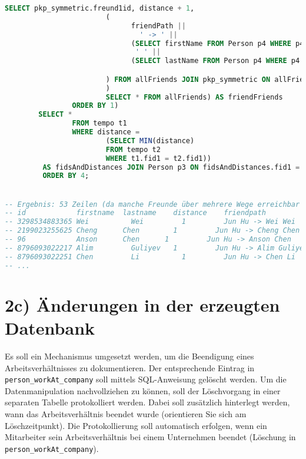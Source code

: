 \begin{lstlisting}[language=sql]
                        SELECT pkp_symmetric.freund1id, distance + 1,
                        (
                              friendPath ||
                                ' -> ' ||
                              (SELECT firstName FROM Person p4 WHERE p4.id = pkp_symmetric.freund1id) ||
                               ' ' ||
                              (SELECT lastName FROM Person p4 WHERE p4.id = pkp_symmetric.freund1id)

                        ) FROM allFriends JOIN pkp_symmetric ON allFriends.fid1=pkp_symmetric.person1id
                        )
                        SELECT * FROM allFriends) AS friendFriends
                ORDER BY 1)
        SELECT *
                FROM tempo t1
                WHERE distance =
                        (SELECT MIN(distance)
                        FROM tempo t2
                        WHERE t1.fid1 = t2.fid1))
         AS fidsAndDistances JOIN Person p3 ON fidsAndDistances.fid1 = p3.id
         ORDER BY 4;


-- Ergebnis: 53 Zeilen (da manche Freunde über mehrere Wege erreichbar sind!)
-- id 	         firstname 	lastname 	distance 	friendpath
-- 3298534883365 Wei	      Wei	      1         Jun Hu -> Wei Wei
-- 2199023255625 Cheng	    Chen	    1         Jun Hu -> Cheng Chen
-- 96            Anson	    Chen      1        	Jun Hu -> Anson Chen
-- 8796093022217 Alim	      Guliyev   1         Jun Hu -> Alim Guliyev
-- 8796093022251 Chen	      Li	      1        	Jun Hu -> Chen Li
-- ...
\end{lstlisting}

\newpage
\section*{2c) Änderungen in der erzeugten Datenbank}
Es soll ein Mechanismus umgesetzt werden, um die Beendigung eines Arbeitsverhältnisses zu dokumentieren.
Der entsprechende Eintrag in \texttt{person\_workAt\_company} soll mittels SQL-Anweisung gelöscht werden.
Um die Datenmanipulation nachvollziehen zu können, soll der Löschvorgang in einer separaten Tabelle protokolliert werden.
Dabei soll zusätzlich hinterlegt werden, wann das Arbeitsverhältnis beendet wurde (orientieren Sie sich am Löschzeitpunkt).
Die Protokollierung soll automatisch erfolgen, wenn ein Mitarbeiter sein Arbeitsverhältnis bei einem Unternehmen beendet (Löschung in \texttt{person\_workAt\_company}).


